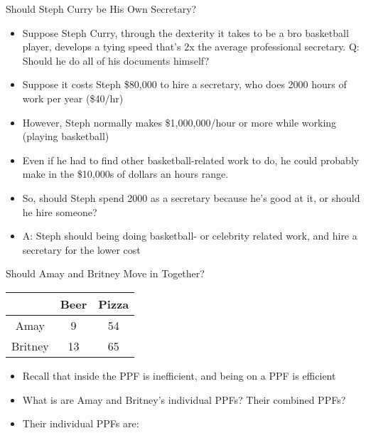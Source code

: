 \documentclass[10pt,xcolor={svgnames}]{beamer}
\begin{document}
\begin{frame}{Should Steph Curry be His Own Secretary?}
\begin{itemize}[<+->]
    \item Suppose Steph Curry, through the dexterity it takes to be a bro basketball player, develops a tying speed that's 2x the average professional secretary. Q: Should he do all of his documents himself?
    \item Suppose it costs Steph \$80,000 to hire a secretary, who does 2000 hours of work per year (\$40/hr)
    \item However, Steph normally makes \$1,000,000/hour or more while working (playing basketball)
    \item Even if he had to find other basketball-related work to do, he could probably make in the \$10,000s  of dollars an hours range. 
    \item So, should Steph spend 2000 as a secretary because he's good at it, or should he hire someone?
    \item A: Steph should being doing basketball- or celebrity related work, and hire a secretary for the lower cost
\end{itemize}
\end{frame}


\begin{frame}{Should Amay and Britney Move in Together?}
    \begin{table}[]
        \centering
        \begin{tabular}{c|c|c|} 
            & Beer & Pizza\\
            \hline
            Amay & 9 & 54 \\
            \hline
            Britney & 13 & 65\\
            \hline
        \end{tabular}
    \end{table}
\begin{itemize}[<+->]
    \item Recall that inside the PPF is inefficient, and being on a PPF is efficient
    \item What is are Amay and Britney's individual PPFs? Their combined PPFs?
    \item Their individual PPFs are:\vspace{50mm}
\end{itemize}
\end{frame}
\end{document}
